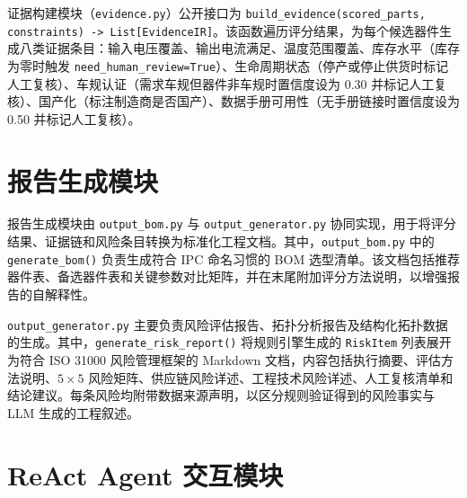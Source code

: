 证据构建模块（\texttt{evidence.py}）公开接口为 
\texttt{build\_evidence(scored\_parts, constraints) -> List[EvidenceIR]}。该函数遍历评分结果，为每个候选器件生成八类证据条目：输入电压覆盖、输出电流满足、温度范围覆盖、库存水平（库存为零时触发 \texttt{need\_human\_review=True}）、生命周期状态（停产或停止供货时标记人工复核）、车规认证（需求车规但器件非车规时置信度设为 0.30 并标记人工复核）、国产化（标注制造商是否国产）、数据手册可用性（无手册链接时置信度设为 0.50 并标记人工复核）。

\section{报告生成模块}

报告生成模块由 \texttt{output\_bom.py} 与 \texttt{output\_generator.py} 协同实现，用于将评分结果、证据链和风险条目转换为标准化工程文档。其中，\texttt{output\_bom.py} 中的 \texttt{generate\_bom()} 负责生成符合 IPC 命名习惯的 BOM 选型清单。该文档包括推荐器件表、备选器件表和关键参数对比矩阵，并在末尾附加评分方法说明，以增强报告的自解释性。

\texttt{output\_generator.py} 主要负责风险评估报告、拓扑分析报告及结构化拓扑数据的生成。其中，\texttt{generate\_risk\_report()} 将规则引擎生成的 \texttt{RiskItem} 列表展开为符合 ISO 31000 风险管理框架的 Markdown 文档，内容包括执行摘要、评估方法说明、$5\times 5$ 风险矩阵、供应链风险详述、工程技术风险详述、人工复核清单和结论建议。每条风险均附带数据来源声明，以区分规则验证得到的风险事实与 LLM 生成的工程叙述。



\section{ReAct Agent 交互模块}

